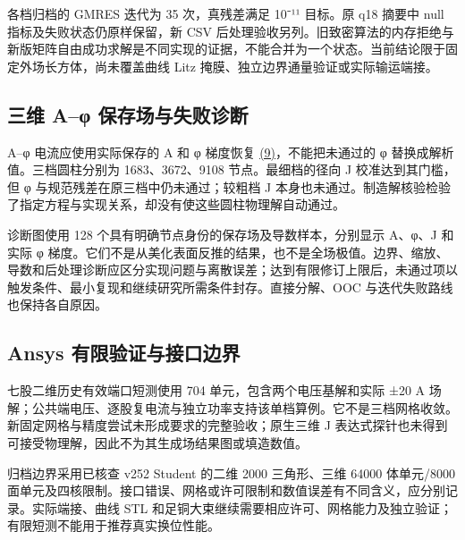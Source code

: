 \documentclass[journal,10pt]{IEEEtran}
\begin{document}
各档归档的 GMRES 迭代为 35 次，真残差满足 10⁻¹¹ 目标。原 q18 摘要中 null 指标及失败状态仍原样保留，新 CSV 后处理验收另列。旧致密算法的内存拒绝与新版矩阵自由成功求解是不同实现的证据，不能合并为一个状态。当前结论限于固定外场长方体，尚未覆盖曲线 Litz 掩膜、独立边界通量验证或实际输运端接。


\subsection*{三维 A–φ 保存场与失败诊断}
\hypertarget{S2.aphi.heading}{}
A–φ 电流应使用实际保存的 A 和 φ 梯度恢复 \href{paper_zh-CN_ieee.pdf#E07}{(9)}，不能把未通过的 φ 替换成解析值。三档圆柱分别为 1683、3672、9108 节点。最细档的径向 J 校准达到其门槛，但 φ 与规范残差在原三档中仍未通过；较粗档 J 本身也未通过。制造解核验检验了指定方程与实现关系，却没有使这些圆柱物理解自动通过。


诊断图使用 128 个具有明确节点身份的保存场及导数样本，分别显示 A、φ、J 和实际 φ 梯度。它们不是从美化表面反推的结果，也不是全场极值。边界、缩放、导数和后处理诊断应区分实现问题与离散误差；达到有限修订上限后，未通过项以触发条件、最小复现和继续研究所需条件封存。直接分解、OOC 与迭代失败路线也保持各自原因。


\subsection*{Ansys 有限验证与接口边界}
\hypertarget{S2.ansys.heading}{}
七股二维历史有效端口短测使用 704 单元，包含两个电压基解和实际 ±20 A 场解；公共端电压、逐股复电流与独立功率支持该单档算例。它不是三档网格收敛。新固定网格与精度尝试未形成要求的完整验收；原生三维 J 表达式探针也未得到可接受物理解，因此不为其生成场结果图或填造数值。


归档边界采用已核查 v252 Student 的二维 2000 三角形、三维 64000 体单元/8000 面单元及四核限制。接口错误、网格或许可限制和数值误差有不同含义，应分别记录。实际端接、曲线 STL 和足铜大束继续需要相应许可、网格能力及独立验证；有限短测不能用于推荐真实换位性能。
\end{document}
